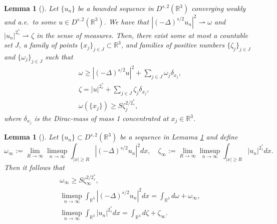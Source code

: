 \documentclass[11pt]{article}
\numberwithin{equation}{section}
\newtheorem{lemma}[theorem]{Lemma}
\begin{document}
\begin{lemma}[\cite{Z1688}] \label{lem2.131}
Let $\{u_n\}$ be a bounded sequence in $D^{s,2}(\mathbb{R}^3)$ converging weakly
and a.e.\ to some $u\in D^{s,2}(\mathbb{R}^3)$.
 We have that $|(-\Delta)^{s/2}u_n|^2\rightharpoonup \omega$ and
 $|u_n|^{2^*_s}\rightharpoonup \zeta$ in the sense of measures.
Then, there exist some at most a countable set $J$, a family of points
$\{x_j\}_{j\in J} \subset \mathbb{R}^3$, and families of positive numbers
$\{\zeta_j\}_{j\in J}$ and $\{\omega_j\}_{j\in J}$ such that
\begin{gather}\label{lab3.11}
\omega \geq |(-\Delta)^{s/2}u|^2+\sum_{j\in J}\omega_j\delta_{x_j}, \\
\label{lab3.12}
\zeta=|u|^{2^*_s}+\sum_{j\in J}\zeta_j\delta_{x_j}, \\
\label{lab3.13}
\omega(\{x_j\})\geq S\zeta^{2/2^*_s}_j,
\end{gather}
where $\delta_{x_j}$ is the Dirac-mass of mass 1 concentrated at
$x_j\in {\mathbb{R}^3}$.
\end{lemma}


\begin{lemma}[\cite{Z1688}] \label{lem2.11}
Let $\{u_n\}\subset D^{s,2}(\mathbb{R}^3)$ be a sequence in Lemama \ref{lem2.131}
and define
\[
\omega_\infty:={\lim_{R\to \infty}}\limsup_{n\to\infty}
\int_{|x|\geq R} |(-\Delta)^{s/2}u_n|^2dx , \quad
\zeta_\infty:={\lim_{R\to \infty}}\limsup_{n\to\infty}
\int_{|x|\geq R} |u_n|^{2^*_s}dx.
\]
Then it follows that
\begin{gather*}%
\omega_\infty \geq S\zeta^{2/2^*_s}_\infty, \\
\limsup_{n\to\infty} \int_{\mathbb{R}^3}|(-\Delta)^{s/2}u_n|^2dx
=\int_{\mathbb{R}^3}d\omega +\omega_\infty,\\
\limsup_{n\to\infty} \int_{\mathbb{R}^3}|u_n|^{2^*_s}dx=\int_{\mathbb{R}^3}d\zeta +\zeta_\infty.\\
\end{gather*}
\end{lemma}
\end{document}
